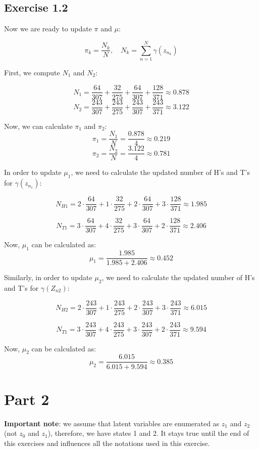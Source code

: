 \documentclass[11pt,a4paper]{article}
\begin{document}
	
	\subsection*{Exercise 1.2}
	
	Now we are ready to update $\pi$ and $\mu$:
	
	$$\pi_k = \frac{N_k}{N}, \quad N_k = \sum\limits_{n=1}^N \gamma(z_{n_k})$$
	
	First, we compute $N_1$ and $N_2$:
	
	$$ N_1 = \frac{64}{307} + \frac{32}{275} + \frac{64}{307} + \frac{128}{371} \approx 0.878$$
	$$ N_2 = \frac{243}{307} + \frac{243}{275} + \frac{243}{307} + \frac{243}{371} \approx 3.122$$
	
	Now, we can calculate $\pi_1$ and $\pi_2$:
	$$\pi_1 = \frac{N_1}{N} = \frac{0.878}{4} \approx 0.219$$
	$$\pi_2 = \frac{N_2}{N} = \frac{3.122}{4} \approx 0.781$$
	
	In order to update $\mu_1$, we need to calculate the updated number of H's and T's for $\gamma(z_{n_1})$:
	
	$$N_{H1}= 2 \cdot \frac{64}{307} + 1 \cdot  \frac{32}{275}  + 2 \cdot \frac{64}{307} + 3 \cdot \frac{128}{371} \approx 1.985$$
	
	$$N_{T1}= 3 \cdot \frac{64}{307} + 4 \cdot  \frac{32}{275}  + 3 \cdot \frac{64}{307} + 2 \cdot \frac{128}{371} \approx 2.406$$
	
	Now, $\mu_1$ can be calculated as:
	$$\mu_1 = \frac{1.985}{1.985+2.406} \approx 0.452 $$
	
	
	Similarly, in order to update $\mu_2$, we need to calculate the updated number of H's and T's for $\gamma(Z_{n2})$:
	
	$$N_{H2}= 2 \cdot \frac{243}{307} + 1 \cdot  \frac{243}{275}  + 2 \cdot \frac{243}{307} + 3 \cdot \frac{243}{371} \approx 6.015$$
	
	$$N_{T1}= 3 \cdot \frac{243}{307} + 4 \cdot  \frac{243}{275}  + 3 \cdot \frac{243}{307} + 2 \cdot \frac{243}{371} \approx 9.594$$
	
	Now, $\mu_2$ can be calculated as:
	$$\mu_2 = \frac{6.015}{6.015+9.594} \approx 0.385 $$
	
	
	\section*{Part 2}
	\textbf{Important note}: we assume that latent variables are enumerated as $z_1$ and $z_2$ (not $z_0$ and $z_1$), therefore, we have states 1 and 2. It stays true until the end of this exercises and influences all the notations used in this exercise.
	
\end{document}
